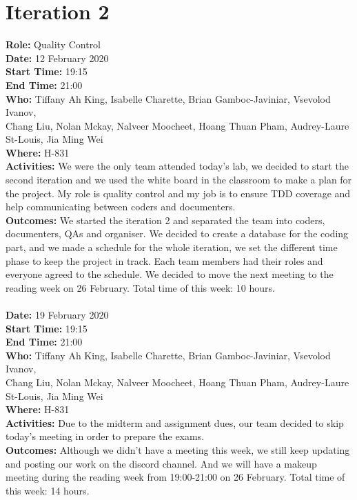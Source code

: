\documentclass[12pt]{article}
\begin{document}
\section{Iteration 2}
{\bf Role:} Quality Control\\
{\bf Date:} 12 February 2020\\
{\bf Start Time:} 19:15\\
{\bf End Time:} 21:00\\
{\bf Who:} Tiffany Ah King, Isabelle Charette, Brian Gamboc-Javiniar, Vsevolod Ivanov,\\
Chang Liu, Nolan Mckay, Nalveer Moocheet, Hoang Thuan Pham, Audrey-Laure St-Louis, Jia Ming Wei\\
{\bf Where:} H-831\\
{\bf Activities:} We were the only team attended today's lab, we decided to start the second iteration and we used the white board in the classroom to make a plan for the project. My role is quality control and my job is to ensure TDD coverage and help communicating between coders and documenters.\\
{\bf Outcomes:} We started the iteration 2 and separated the team into coders, documenters, QAs and organiser. We decided to create a database for the coding part, and we made a schedule for the whole iteration, we set the different time phase to keep the project in track. Each team members had their roles and everyone agreed to the schedule. We decided to move the next meeting to the reading week on 26 February. Total time of this week: 10 hours.\\
\\
{\bf Date:} 19 February 2020\\
{\bf Start Time:} 19:15\\
{\bf End Time:} 21:00\\
{\bf Who:} Tiffany Ah King, Isabelle Charette, Brian Gamboc-Javiniar, Vsevolod Ivanov,\\
Chang Liu, Nolan Mckay, Nalveer Moocheet, Hoang Thuan Pham, Audrey-Laure St-Louis, Jia Ming Wei\\
{\bf Where:} H-831\\
{\bf Activities:} Due to the midterm and assignment dues, our team decided to skip today's meeting in order to prepare the exams.\\
{\bf Outcomes:} Although we didn't have a meeting this week, we still keep updating and posting our work on the discord channel. And we will have a makeup meeting during the reading week from 19:00-21:00 on 26 February. Total time of this week: 14 hours.\\
\end{document}
